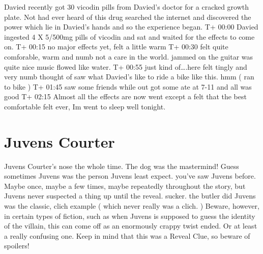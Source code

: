\documentclass[12pt]{book}
\begin{document}
Davied recently got 30 vicodin pills from Davied's doctor for a cracked growth plate. Not had ever heard of this drug searched the internet and discovered the power which lie in Davied's hands and so the experience began. T+ 00:00 Davied ingested 4 X 5/500mg pills of vicodin and sat and waited for the effects to come on. T+ 00:15 no major effects yet, felt a little warm T+ 00:30 felt quite comforable, warm and numb not a care in the world. jammed on the guitar was quite nice music flowed like water. T+ 00:55 just kind of\ldots .here felt tingly and very numb thought of saw what Davied's like to ride a bike like this. hmm ( ran to bike ) T+ 01:45 saw some friends while out got some ate at 7-11 and all was good T+ 02:15 Almost all the effects are now went except a felt that the best comfortable felt ever, Im went to sleep well tonight.



\chapter{Juvens Courter}

Juvens Courter's nose the whole time. The dog was the mastermind! Guess sometimes Juvens was the person Juvens least expect. you've saw Juvens before. Maybe once, maybe a few times, maybe repeatedly throughout the story, but Juvens never suspected a thing up until the reveal. sucker. the butler did Juvens was the classic, clich example ( which never really was a clich. ) Beware, however, in certain types of fiction, such as when Juvens is supposed to guess the identity of the villain, this can come off as an enormously crappy twist ended. Or at least a really confusing one. Keep in mind that this was a Reveal Clue, so beware of spoilers!
\end{document}

